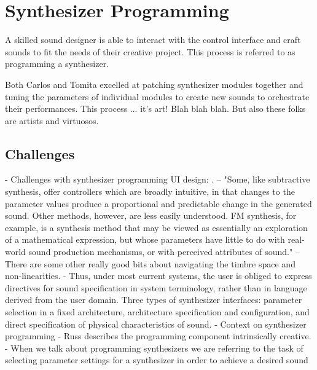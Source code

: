 \section{Synthesizer Programming}
 A skilled sound designer is able to interact with the control interface and craft sounds to fit the needs of their creative project. This process is referred to as programming a synthesizer. 

Both Carlos and Tomita excelled at patching synthesizer modules together and tuning the parameters of individual modules to create new sounds to orchestrate their performances. This process ... it's art! Blah blah blah. But also these folks are artists and virtuosos.

\subsection{Challenges}
- Challenges with synthesizer programming UI design: \cite{seago2013new}. -- "Some, like subtractive synthesis, offer controllers which are broadly intuitive, in that changes to the parameter values produce a proportional and predictable change in the generated sound. Other methods, however, are less easily understood. FM synthesis, for example, is a synthesis method that may be viewed as essentially an exploration of a mathematical expression, but whose parameters have little to do with real-world sound production mechanisms, or with perceived attributes of sound." -- There are some other really good bits about navigating the timbre space and non-linearities.
- \cite{seago2004critical} Thus, under most current systems, the user is obliged to express directives for sound specification in system terminology, rather than in language derived from the user domain. Three types of synthesizer interfaces: parameter selection in a fixed architecture, architecture specification and configuration, and direct specification of physical characteristics of sound.
- Context on synthesizer programming \cite{jenkins2019analog}
- Russ describes the programming component intrinsically creative.
- When we talk about programming synthesizers we are referring to the task of selecting parameter settings for a synthesizer in order to achieve a desired sound

